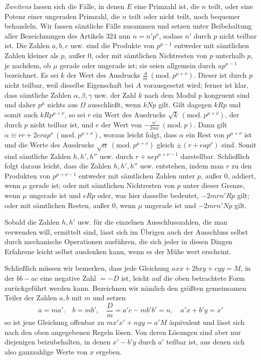 \textit{Zweitens} lassen sich die Fälle, in denen \(E\) eine Primzahl ist, die \(n\) teilt, oder eine Potenz einer ungeraden Primzahl, die \(n\) teilt oder nicht teilt, noch bequemer behandeln. Wir fassen sämtliche Fälle zusammen und setzen unter Beibehaltung aller Bezeichnungen des Artikels \(324\) nun \(n=n'p^\nu\), sodass \(n'\) durch \(p\) nicht teilbar ist. Die Zahlen \(a,\allowbreak b,\allowbreak c\) usw. sind die Produkte von \(p^{\mu-1}\) entweder mit sämtlichen Zahlen kleiner als \(p\), außer \(0\), oder mit sämtlichen Nichtresten von \(p\) unterhalb \(p\), je nachdem, ob \(\mu\) gerade oder ungerade ist; sie seien allgemein durch \(up^{\mu-1}\) bezeichnet. Es sei \(k\) der Wert des Ausdrucks \(\frac Am\ (\mathrm{mod.}\ p^{\mu+\nu})\). Dieser ist durch \(p\) nicht teilbar, weil dieselbe Eigenschaft bei \(A\) vorausgesetzt wird;
ferner ist klar, dass sämtliche Zahlen \(\alpha,\allowbreak \beta,\allowbreak \gamma\) usw. der Zahl \(k\) nach dem Modul \(p\) kongruent sind und daher \(p^\mu\) nichts aus \(\Omega\) ausschließt, wenn \(kNp\) gilt. Gilt dagegen \(kRp\) und somit auch \(kRp^{\mu+\nu}\), so sei \(r\) ein Wert des Ausdrucks \(\surd k\ (\mathrm{mod.}\ p^{\mu+\nu})\), der durch \(p\) nicht teilbar ist, und \(e\) der Wert von \(-\frac{n'}{2mr}\ (\mathrm{mod.}\ p)\). Dann gilt \(\alpha\equiv rr+2era p^\nu\ (\mathrm{mod.}\ p^{\mu+\nu})\), woraus leicht folgt, dass \(\alpha\) ein Rest von \(p^{\mu+\nu}\) ist und die Werte des Ausdrucks \(\surd\alpha\ (\mathrm{mod.}\ p^{\mu+\nu})\) gleich \(\pm(r+ea p^\nu)\) sind. Somit sind sämtliche Zahlen \(h,\allowbreak h',\allowbreak h''\) usw. durch \(r+uep^{\mu+\nu-1}\) darstellbar. Schließlich folgt daraus leicht, dass die Zahlen \(h,\allowbreak h',\allowbreak h''\) usw. entstehen, indem man \(r\) zu den Produkten von \(p^{\mu+\nu-1}\) entweder mit sämtlichen Zahlen unter \(p\), außer \(0\), addiert, wenn \(\mu\) gerade ist; oder mit sämtlichen Nichtresten von \(p\) unter dieser Grenze, wenn \(\mu\) ungerade ist und \(eRp\) oder, was hier dasselbe bedeutet, \(-2mrn'Rp\) gilt; oder mit sämtlichen Resten, außer \(0\), wenn \(\mu\) ungerade ist und \(-2mrn'Np\) gilt.

Sobald die Zahlen \(h,\allowbreak h'\) usw. für die einzelnen Ausschlusszahlen, die man verwenden will, ermittelt sind, lässt sich im Übrigen auch der Ausschluss selbst durch mechanische Operationen ausführen, die sich jeder in diesen Dingen Erfahrene leicht selbst ausdenken kann, wenn es der Mühe wert erscheint.

Schließlich müssen wir bemerken, dass jede Gleichung \(axx+2bxy+cyy=M\), in der \(bb-ac\) eine negative Zahl \(=-D\) ist, leicht auf die oben betrachtete Form zurückgeführt werden kann. Bezeichnen wir nämlich den größten gemeinsamen Teiler der Zahlen \(a,\allowbreak b\) mit \(m\) und setzen \[ a=ma'.\quad b=mb',\quad \frac Dm=a'c-mb'b'=n,\quad a'x+b'y=x' \] so ist jene Gleichung offenbar zu \(mx'x'+nyy=a'M\) äquivalent und lässt sich nach den oben angegebenen Regeln lösen. Von deren Lösungen sind aber nur diejenigen beizubehalten, in denen \(x'-b'y\) durch \(a'\) teilbar ist, aus denen sich also ganzzahlige Werte von \(x\) ergeben.

